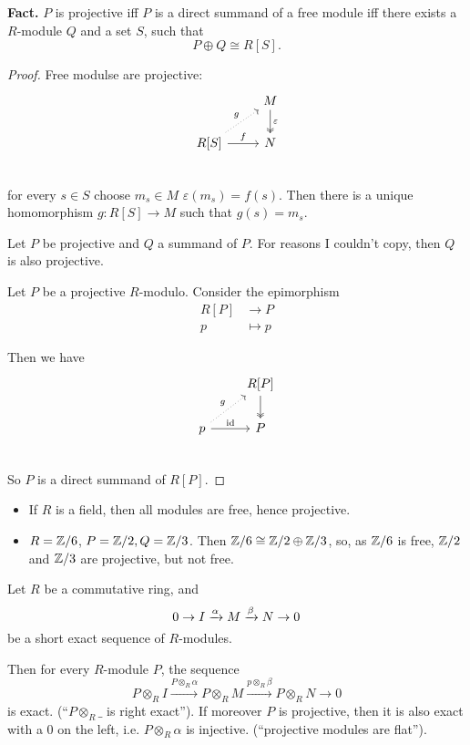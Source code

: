 \documentclass[language=english]{TemplateLecture}
\begin{document}
\textbf{Fact.} \(P\) is projective iff \(P\) is a direct summand of a free module iff there exists a \(R\)-module \(Q\) and a set \(S\), such that
\[P \oplus Q \cong R[S].\]

\begin{proof}
    Free modulse are projective:
    \[\begin{tikzcd}
        & M \ar[d, "\varepsilon", two heads] \\
        R[S] \ar[r, "f"] \ar[ru, dotted, "g"] & N \\
    \end{tikzcd}\]
    for every \(s \in S\) choose \(m_s \in M\) \(\varepsilon(m_s) = f(s)\). Then there is a unique homomorphism \(g\colon R[S] \to M\) such that \(g(s) = m_s\).
    
    Let \(P\) be projective and \(Q\) a summand of \(P\). For reasons I couldn't copy, then \(Q\) is also projective.

Let \(P\) be a projective \(R\)-modulo. Consider the epimorphism
\[\begin{split}
    R[P ] &\to P \\
    p &\mapsto p
\end{split}\]

Then we have
\[\begin{tikzcd}
    & R[P] \ar[d, two heads] \\
    p \ar[ru, dotted, "g"] \ar[r, "\id"] & P \\
\end{tikzcd}\]
So \(P\) is a direct summand of \(R[P]\).

\end{proof}

\begin{itemize}
    \item If \(R\) is a field, then all modules are free, hence projective.
    \item \(R = \mathbb{Z}/6\), \(P = \mathbb{Z}/2, Q = \mathbb{Z}/3\). Then \(\mathbb{Z}/6 \cong \mathbb{Z}/2\oplus \mathbb{Z}/3\), so, as \(\mathbb{Z}/6\) is free, \(\mathbb{Z}/2\) and \( \mathbb{Z}/3\) are projective, but not free.
\end{itemize}

\begin{proposition}
    Let \(R\) be a commutative ring, and
    \[0 \rightarrow I \xrightarrow{\alpha} M \xrightarrow{\beta} N \to 0\]
    be a short exact sequence of \(R\)-modules.

    Then for every \(R\)-module \(P\), the sequence
    \[P\otimes_R I \xrightarrow{P\otimes_R \alpha} P \otimes_R M \xrightarrow{p\otimes_R \beta} P\otimes_R N \to 0\]
    is exact. (\enquote{\(P \otimes_R \_\) is right exact}). If moreover \(P\) is projective, then it is also exact with a \(0\) on the left, i.e. \(P\otimes_R \alpha\) is injective. (\enquote{projective modules are flat}).
\end{proposition}
\end{document}
